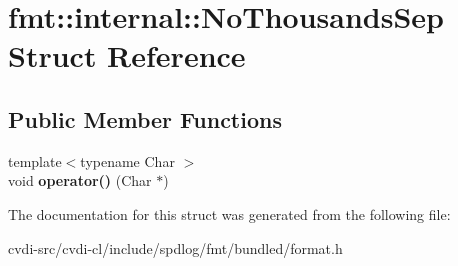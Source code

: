 \hypertarget{structfmt_1_1internal_1_1NoThousandsSep}{}\section{fmt\+:\+:internal\+:\+:No\+Thousands\+Sep Struct Reference}
\label{structfmt_1_1internal_1_1NoThousandsSep}
\subsection*{Public Member Functions}
\begin{DoxyCompactItemize}
\item 
{\footnotesize template$<$typename Char $>$ }\\void {\bfseries operator()} (Char $\ast$)\hypertarget{structfmt_1_1internal_1_1NoThousandsSep_ab253f8385a85334b2fd9b0bfb551a6a6}{}\label{structfmt_1_1internal_1_1NoThousandsSep_ab253f8385a85334b2fd9b0bfb551a6a6}

\end{DoxyCompactItemize}


The documentation for this struct was generated from the following file\+:\begin{DoxyCompactItemize}
\item 
cvdi-\/src/cvdi-\/cl/include/spdlog/fmt/bundled/format.\+h\end{DoxyCompactItemize}
